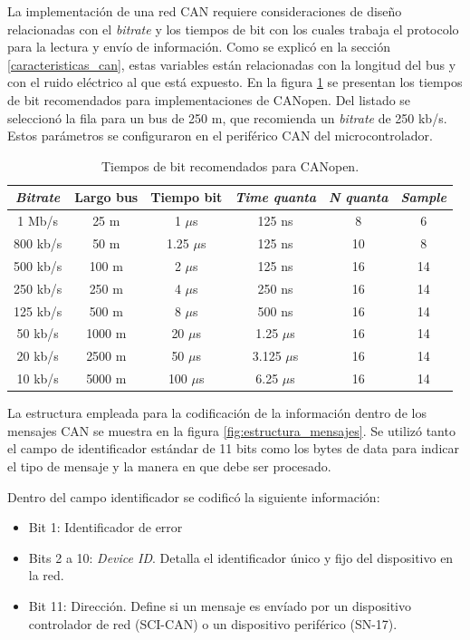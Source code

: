 La implementación de una red CAN requiere consideraciones de diseño relacionadas con el \textit{bitrate} y los tiempos de bit con los cuales trabaja el protocolo para la lectura y envío de información. Como se explicó en la sección \ref{caracteristicas_can}, estas variables están relacionadas con la longitud del bus y con el ruido eléctrico al que está expuesto. En la figura \ref{tab:bit_times} se presentan los tiempos de bit recomendados para implementaciones de CANopen\citep{UnderstandingCAN}. Del listado se seleccionó la fila para un bus de 250 m, que recomienda un \textit{bitrate} de 250 kb/s. Estos parámetros se configuraron en el periférico CAN del microcontrolador.


\begin{table}[h]
	\centering
	\caption[Tiempos de bit recomendados para CANopen.]{Tiempos de bit recomendados para CANopen.}
	\begin{tabular}{c c c c c c}    
		\toprule
		\textbf{\textit{Bitrate}} & \textbf{Largo bus} & \textbf{Tiempo bit} & \textbf{\textit{Time quanta}} & \textbf{\textit{N quanta}} & \textbf{\textit{Sample}} \\
		\midrule
		1 Mb/s 		& 25 m 	& 1 $\mu$s		& 125 ns & 8 	& 6 \\
		800 kb/s 	& 50 m 	& 1.25 $\mu$s	& 125 ns & 10 	& 8 \\
		500 kb/s 	& 100 m & 2 $\mu$s		& 125 ns & 16 	& 14 \\
		250 kb/s 	& 250 m & 4 $\mu$s		& 250 ns & 16 	& 14 \\
		125 kb/s 	& 500 m & 8 $\mu$s		& 500 ns & 16 	& 14 \\
		50 kb/s 	& 1000 m & 20 $\mu$s	& 1.25 $\mu$s & 16 	& 14 \\
		20 kb/s 	& 2500 m & 50 $\mu$s	& 3.125 $\mu$s & 16 	& 14 \\
		10 kb/s 	& 5000 m & 100 $\mu$s	& 6.25 $\mu$s & 16 	& 14 \\
		\bottomrule
		\hline
	\end{tabular}
	\label{tab:bit_times}
\end{table}


La estructura empleada para la codificación de la información dentro de los mensajes CAN se muestra en la figura \ref{fig:estructura_mensajes}. Se utilizó tanto el campo de identificador estándar de 11 bits como los bytes de data para indicar el tipo de mensaje y la manera en que debe ser procesado.

Dentro del campo identificador se codificó la siguiente información:
\begin{itemize}
	\item Bit 1: Identificador de error
	\item Bits 2 a 10: \textit{Device ID}. Detalla el identificador único y fijo del dispositivo en la red.
	\item Bit 11: Dirección. Define si un mensaje es envíado por un dispositivo controlador de red (SCI-CAN) o un dispositivo periférico (SN-17).
\end{itemize}

